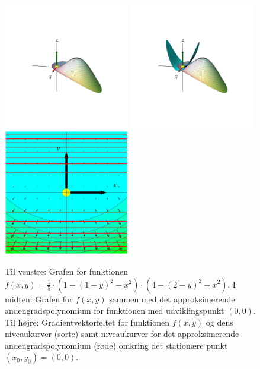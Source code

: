 \begin{figure}[ht]
\centerline{ \includegraphics[height=55mm]{plotVar2Fig8.pdf}  \includegraphics[height=55mm]{plotVar2FigApp8.pdf}  \includegraphics[height=55mm]{plotGrad8.pdf}}
\begin{center}
\caption{Til venstre: Grafen for funktionen $f(x,y) = \frac{1}{5}\cdot \left( 1 - (1-y)^{2} -x^{2}\right) \cdot \left( 4 - (2-y)^{2} - x^{2} \right)$. I midten: Grafen for $f(x,y)$ sammen med det approksimerende andengradspolynomium for funktionen med udviklingspunkt $(0, 0)$. Til højre: Gradientvektorfeltet for funktionen $f(x,y)$ og dens niveaukurver (sorte) samt niveaukurver for det approksimerende andengradspolynomium (røde) omkring det stationære punkt $(x_{0}, y_{0}) = (0, 0)$.} \label{figStatInspec4}
\end{center}
\end{figure}




